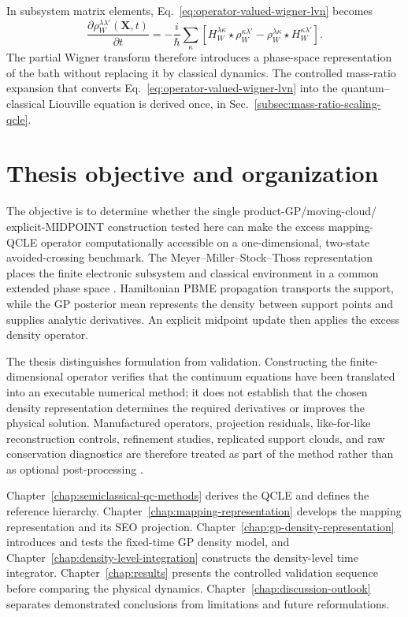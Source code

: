 \documentclass[
  11pt,
  letterpaper,
  onehalfspacing,
  normalmargins,
  equalmargins,
  oneside
]{ut-thesis}
\begin{document}
In subsystem matrix elements, Eq.~\eqref{eq:operator-valued-wigner-lvn}
becomes
\begin{equation}
\frac{\partial
\rho_W^{\lambda\lambda'}(\mathbf X,t)}
{\partial t}
=
-\frac{i}{\hbar}
\sum_{\kappa}
\left[
H_W^{\lambda\kappa}
\star
\rho_W^{\kappa\lambda'}
-
\rho_W^{\lambda\kappa}
\star
H_W^{\kappa\lambda'}
\right].
\label{eq:matrix-valued-wigner-lvn}
\end{equation}
The partial Wigner transform therefore introduces a phase-space representation
of the bath without replacing it by classical dynamics. The controlled
mass-ratio expansion that converts Eq.~\eqref{eq:operator-valued-wigner-lvn}
into the quantum--classical Liouville equation is derived once, in
Sec.~\ref{subsec:mass-ratio-scaling-qcle}.

\section{Thesis objective and organization}
\label{sec:thesis-objective-contribution}

The objective is to determine whether the single product-GP/moving-cloud/
explicit-MIDPOINT construction tested here can make the excess mapping-QCLE
operator computationally accessible on a one-dimensional, two-state
avoided-crossing benchmark. The Meyer--Miller--Stock--Thoss representation
places the finite electronic subsystem and classical environment in a common
extended phase space
\cite{MeyerMiller1979JCP,StockThoss1997PRL,StockThoss2005,Kim2008JCP}.
Hamiltonian PBME propagation transports the support, while the GP posterior
mean represents the density between support points and supplies analytic
derivatives. An explicit midpoint update then applies the excess density
operator.

The thesis distinguishes formulation from validation. Constructing the
finite-dimensional operator verifies that the continuum equations have been
translated into an executable numerical method; it does not establish that the
chosen density representation determines the required derivatives or improves
the physical solution. Manufactured operators, projection residuals,
like-for-like reconstruction controls, refinement studies, replicated support
clouds, and raw conservation diagnostics are therefore treated as part of the
method rather than as optional post-processing
\cite{Roy2005Verification,RoyOberkampf2011}.

Chapter~\ref{chap:semiclassical-qc-methods} derives the QCLE and defines the
reference hierarchy. Chapter~\ref{chap:mapping-representation} develops the
mapping representation and its SEO projection.
Chapter~\ref{chap:gp-density-representation} introduces and tests the
fixed-time GP density model, and
Chapter~\ref{chap:density-level-integration} constructs the density-level time
integrator. Chapter~\ref{chap:results} presents the controlled validation
sequence before comparing the physical dynamics.
Chapter~\ref{chap:discussion-outlook} separates demonstrated conclusions from
limitations and future reformulations.
\end{document}
